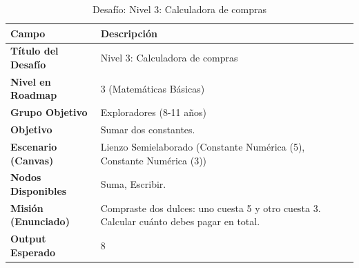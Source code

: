 \begin{table}[H]
    \centering
    \caption{Desafío: Nivel 3: Calculadora de compras}
    \label{tab:desafio-exp-3}
    \begingroup
    \renewcommand{\arraystretch}{\TableRowStretch}
    \begin{tabularx}{\textwidth}{ l X }
        \hline
        \textbf{Campo}              & \textbf{Descripción}                                                                      \\
        \hline
        \textbf{Título del Desafío} & Nivel 3: Calculadora de compras                                                           \\
        \textbf{Nivel en Roadmap}   & 3 (Matemáticas Básicas)                                                                   \\
        \textbf{Grupo Objetivo}     & Exploradores (8-11 años)                                                                  \\
        \textbf{Objetivo}           & Sumar dos constantes.                                                                     \\
        \textbf{Escenario (Canvas)} & Lienzo Semielaborado (Constante Numérica (5), Constante Numérica (3))                     \\
        \textbf{Nodos Disponibles}  & Suma, Escribir.                                                                           \\
        \textbf{Misión (Enunciado)} & Compraste dos dulces: uno cuesta 5 y otro cuesta 3. Calcular cuánto debes pagar en total. \\
        \textbf{Output Esperado}    & 8                                                                                         \\
        \hline
    \end{tabularx}
    \endgroup
\end{table}


